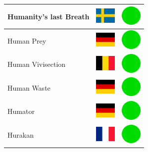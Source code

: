 \documentclass[12pt, a4paper, twoside]{report}
\begin{document}
\begin{center}
\begin{longtable}{|p{5cm}|p{2cm}|p{2cm}|}
 Humanity's last Breath                                     & \includegraphics[width=1cm]{../img/flags/se} &   \includegraphics[width=1cm]{../likes/y} \\ \hline
 Human Prey                                                 & \includegraphics[width=1cm]{../img/flags/de} &   \includegraphics[width=1cm]{../likes/y} \\ \hline
 Human Vivisection                                          & \includegraphics[width=1cm]{../img/flags/be} &   \includegraphics[width=1cm]{../likes/y} \\ \hline
 Human Waste                                                & \includegraphics[width=1cm]{../img/flags/de} &   \includegraphics[width=1cm]{../likes/y} \\ \hline
 Humator                                                    & \includegraphics[width=1cm]{../img/flags/de} &   \includegraphics[width=1cm]{../likes/y} \\ \hline
 Hurakan                                                    & \includegraphics[width=1cm]{../img/flags/fr} &   \includegraphics[width=1cm]{../likes/y} \\ \hline

\end{longtable}
\end{center}
\end{document}
